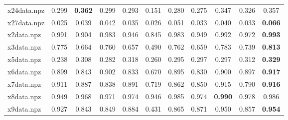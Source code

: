 \documentclass{article}
\begin{document}
\begin{table}[htbp]
\begin{adjustbox}{width=\textwidth}
\begin{tabular}{lcccccccccc}
x24data.npz & 0.299 & \cellcolor{graybg}\textbf{0.362} & 0.299 & 0.293 & 0.151 & 0.280 & 0.275 & 0.347 & 0.326 & 0.357 \\
x27data.npz & 0.025 & 0.039 & 0.042 & 0.035 & 0.026 & 0.051 & 0.033 & 0.040 & 0.033 & \cellcolor{graybg}\textbf{0.066} \\
x2data.npz & 0.991 & 0.904 & 0.983 & 0.946 & 0.845 & 0.983 & 0.949 & 0.992 & 0.972 & \cellcolor{graybg}\textbf{0.993} \\
x3data.npz & 0.775 & 0.664 & 0.760 & 0.657 & 0.490 & 0.762 & 0.659 & 0.783 & 0.739 & \cellcolor{graybg}\textbf{0.813} \\
x5data.npz & 0.238 & 0.308 & 0.282 & 0.318 & 0.260 & 0.295 & 0.297 & 0.297 & 0.312 & \cellcolor{graybg}\textbf{0.329} \\
x6data.npz & 0.899 & 0.843 & 0.902 & 0.833 & 0.670 & 0.895 & 0.830 & 0.900 & 0.897 & \cellcolor{graybg}\textbf{0.917} \\
x7data.npz & 0.911 & 0.887 & 0.838 & 0.891 & 0.719 & 0.862 & 0.850 & 0.915 & 0.790 & \cellcolor{graybg}\textbf{0.916} \\
x8data.npz & 0.949 & 0.968 & 0.971 & 0.974 & 0.946 & 0.985 & 0.974 & \cellcolor{graybg}\textbf{0.990} & 0.978 & 0.986 \\
x9data.npz & 0.927 & 0.843 & 0.849 & 0.884 & 0.431 & 0.865 & 0.871 & 0.950 & 0.857 & \cellcolor{graybg}\textbf{0.954} \\
\hline
\end{tabular}
\end{adjustbox}
\end{table}
\end{document}
